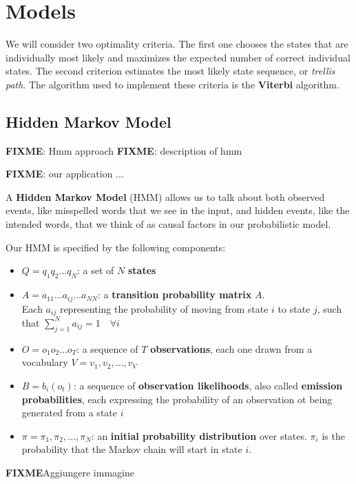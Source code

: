 \chapter{Models}

We will consider two optimality criteria. The first one chooses the states that 
are individually most likely and maximizes the 
expected number of correct individual states. The second criterion estimates the most likely state sequence, or 
\textit{trellis path}. The algorithm used to implement these criteria is the \textbf{Viterbi} algorithm. %

\section{Hidden Markov Model}

\textbf{FIXME}: Hmm approach
\textbf{FIXME}: description of hmm

\textbf{FIXME}: our application ...

A \textbf{Hidden Markov Model} (HMM) allows us to talk about both observed events, like misspelled words that we see in 
the input, and hidden events, like the intended words, that we think of as causal factors in our probabilistic model. 

Our HMM is specified by the following components:
\begin{itemize}
	\item $Q = q_1q_2 \dots q_N$: a set of $N$ \textbf{states}
	\item $A=a_{11}	\dots a_{ij} \dots a_{NN}$: a \textbf{transition probability matrix} $A$. \\ Each $a_{ij}$ representing 
	the probability of moving from state $i$ to state $j$, such that $\sum_{j=1}^N a_{ij}=1 \quad \forall i$
	\item $O = o_1o_2 \dots o_T$: a sequence of $T$ \textbf{observations}, each one drawn from a vocabulary $V = 
	v_1,v_2,\dots,v_V$
	\item $B = b_i (o_t )$: a sequence of \textbf{observation likelihoods}, also called \textbf{emission probabilities}, each 
	expressing the probability of an observation ot being generated from a state $i$
	\item $\pi = \pi_1,\pi_2,\dots,\pi_N$: an \textbf{initial probability distribution} over states. $\pi_i$ is the probability 
	that the Markov chain will start in state $i$. 
\end{itemize}

\textbf{FIXME}{Aggiungere immagine }

